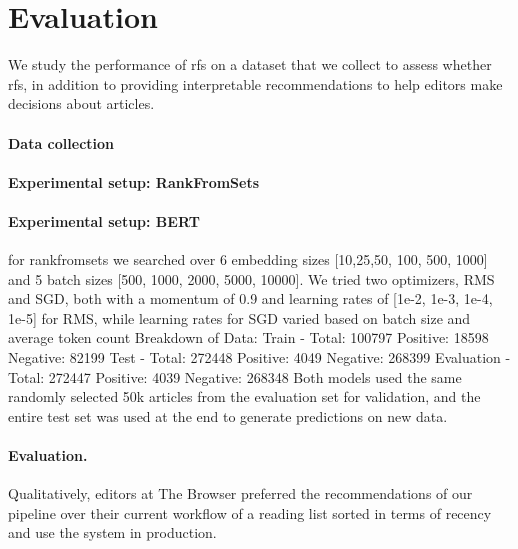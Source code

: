 \section{Evaluation}
\label{sec:experiments}

We study the performance of \acrlong{rfs} on a dataset that we collect to assess whether \gls{rfs}, in addition to providing interpretable recommendations to help editors make decisions about articles.

\paragraph{Data collection}

\paragraph{Experimental setup: RankFromSets}

\paragraph{Experimental setup: BERT}

for rankfromsets we searched over 6 embedding sizes [10,25,50, 100, 500, 1000] and 5 batch sizes [500, 1000, 2000, 5000, 10000]. We tried two optimizers, RMS and SGD, both with a momentum of 0.9 and learning rates of [1e-2, 1e-3, 1e-4, 1e-5] for RMS, while learning rates for SGD varied based on batch size and average token count
Breakdown of Data: Train -      Total: 100797            Positive: 18598                 Negative: 82199
Test -      Total: 272448          Positive: 4049                  Negative: 268399
Evaluation -      Total: 272447            Positive: 4039                  Negative: 268348
Both models used the same randomly selected 50k articles from the evaluation set for validation, and the entire test set was used at the end to generate predictions on new data.




\paragraph{Evaluation.} Qualitatively, editors at The Browser preferred the recommendations of our pipeline over their current workflow of a reading list sorted in terms of recency and use the system in production.